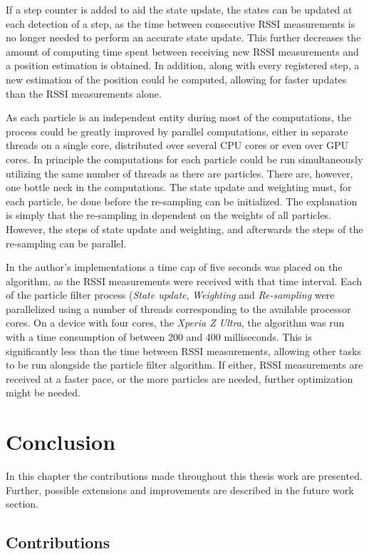 \documentclass{LTHthesis}
\begin{document}
If a step counter is added to aid the state update, the states can be updated at each detection of a step, as the time between consecutive RSSI measurements is no longer needed to perform an accurate state update. This further decreases the amount of computing time spent between receiving new RSSI measurements and a position estimation is obtained. In addition, along with every registered step, a new estimation of the position could be computed, allowing for faster updates than the RSSI measurements alone. 

As each particle is an independent entity during most of the computations, the process could be greatly improved by parallel computations, either in separate threads on a single core, distributed over several CPU cores or even over GPU cores. In principle the computations for each particle could be run simultaneously utilizing the same number of threads as there are particles. There are, however, one bottle neck in the computations. The state update and weighting must, for each particle, be done before the re-sampling can be initialized. The explanation is simply that the re-sampling in dependent on the weights of all particles. However, the steps of state update and weighting, and afterwards the steps of the re-sampling can be parallel. 

In the author's implementations a time cap of five seconds was placed on the algorithm, as the RSSI measurements were received with that time interval. Each of the particle filter process (\emph{State update}, \emph{Weighting} and \emph{Re-sampling} were parallelized using a number of threads corresponding to the available processor cores. On a device with four cores, the \emph{Xperia Z Ultra}, the algorithm was run with a time consumption of  between 200 and 400 milliseconds. This is significantly less than the time between RSSI measurements, allowing other tasks to be run alongside the particle filter algorithm. If either, RSSI measurements are received at a faster pace, or the more particles are needed, further optimization might be needed. 
%

\chapter{Conclusion}
%
In this chapter the contributions made throughout this thesis work are presented. Further, possible extensions and improvements are described in the future work section.
%
\label{chap:conclusion}


\section{Contributions}
\end{document}
